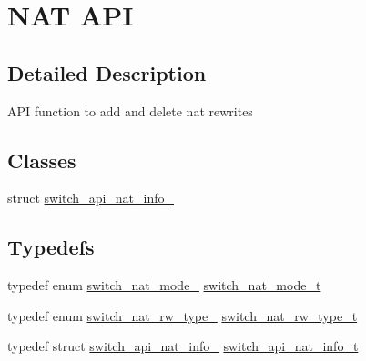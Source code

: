 \hypertarget{group__NAT}{\section{N\+A\+T A\+P\+I}
\label{group__NAT}
}


\subsection{Detailed Description}
A\+P\+I function to add and delete nat rewrites \subsection*{Classes}
\begin{DoxyCompactItemize}
\item 
struct \hyperlink{structswitch__api__nat__info__}{switch\+\_\+api\+\_\+nat\+\_\+info\+\_\+}
\end{DoxyCompactItemize}
\subsection*{Typedefs}
\begin{DoxyCompactItemize}
\item 
typedef enum \hyperlink{group__NAT_ga7c0d74966364e5e894e105a20149dfd3}{switch\+\_\+nat\+\_\+mode\+\_\+} \hyperlink{group__NAT_gaa9738ba923f6bdce6435354dd82f664a}{switch\+\_\+nat\+\_\+mode\+\_\+t}
\item 
typedef enum \hyperlink{group__NAT_ga6b4b3f0aa8ed5ce0e4561e64ea9d45ed}{switch\+\_\+nat\+\_\+rw\+\_\+type\+\_\+} \hyperlink{group__NAT_gae9df51650a50efc09ec777885d4ae142}{switch\+\_\+nat\+\_\+rw\+\_\+type\+\_\+t}
\item 
typedef struct \hyperlink{structswitch__api__nat__info__}{switch\+\_\+api\+\_\+nat\+\_\+info\+\_\+} \hyperlink{group__NAT_ga733f3ff07128e89619717abae4059dc1}{switch\+\_\+api\+\_\+nat\+\_\+info\+\_\+t}
\end{DoxyCompactItemize}
